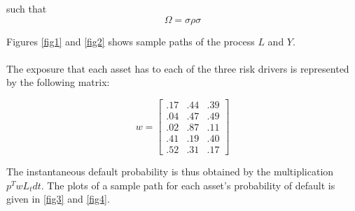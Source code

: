 \documentclass[12pt]{article}
\theoremstyle{definition}
\begin{document}
such that 
\[{\Omega}={\sigma}{\rho} {\sigma}\]

Figures \ref{fig1} and \ref{fig2} shows sample paths of the process \({L}\) and \({Y}\).
\\
\\
The exposure that each asset has to each of the three risk drivers is represented by the following matrix:

\begin{equation}
{w}=\left[ \begin{array}{ccc}
 .17 & .44 & .39 \\
.04 & .47 & .49 \\
.02 & .87 & .11 \\
.41 & .19 & .40 \\
.52 & .31 &.17 
\end{array}\right]
\end{equation}

The instantaneous default probability is thus obtained by the multiplication \({p} ^T {w}{L}_t dt \).  The plots of a sample path for each asset's probability of default is given in \ref{fig3} and \ref{fig4}.  
\end{document}
